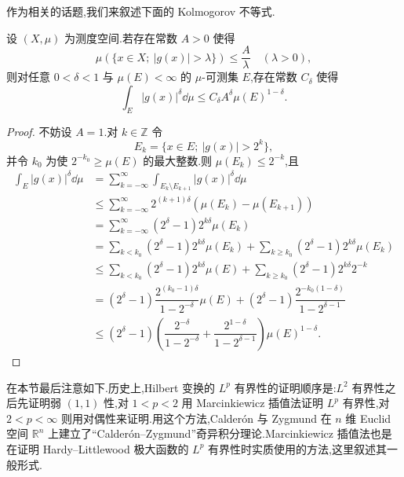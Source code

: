 作为相关的话题,我们来叙述下面的 Kolmogorov 不等式.

\begin{theorem}\label{thm:1.8.5}
设 $(X, \mu)$ 为测度空间.若存在常数 $A > 0$ 使得
\begin{equation*}
\mu(\{x \in X;\ |g(x)| > \lambda\}) \leq \frac{A}{\lambda} \quad (\lambda > 0),
\end{equation*}
则对任意 $0 < \delta < 1$ 与 $\mu(E) < \infty$ 的 $\mu$-可测集 $E$,存在常数 $C_{\delta}$ 使得
\begin{equation*}
\int_{E}|g(x)|^{\delta}\dd \mu \leq C_{\delta}A^{\delta}\mu(E)^{1-\delta}.
\end{equation*}
\end{theorem}

\begin{proof}
不妨设 $A = 1$.对 $k \in \mathbb{Z}$ 令
\begin{equation*}
E_{k} = \{x \in E;\ |g(x)| > 2^{k}\},
\end{equation*}
并令 $k_{0}$ 为使 $2^{-k_{0}} \geq \mu(E)$ 的最大整数.则 $\mu(E_{k}) \leq 2^{-k}$,且
\begin{align*}
\displaystyle\int_{E}|g(x)|^{\delta}\dd \mu &= \sum_{k = -\infty}^{\infty}\int_{E_{k} \setminus E_{k+1}}|g(x)|^{\delta}\dd \mu \\
&\leq \displaystyle\sum_{k = -\infty}^{\infty}2^{(k+1)\delta}\left(\mu(E_{k}) - \mu(E_{k+1})\right) \\
&= \displaystyle\sum_{k = -\infty}^{\infty}(2^{\delta} - 1)2^{k\delta}\mu(E_{k}) \\
&= \displaystyle\sum_{k < k_{0}}(2^{\delta} - 1)2^{k\delta}\mu(E_{k}) + \sum_{k \geq k_{0}}(2^{\delta} - 1)2^{k\delta}\mu(E_{k}) \\
&\leq \displaystyle\sum_{k < k_{0}}(2^{\delta} - 1)2^{k\delta}\mu(E) + \sum_{k \geq k_{0}}(2^{\delta} - 1)2^{k\delta}2^{-k} \\
&= (2^{\delta} - 1)\dfrac{2^{(k_{0}-1)\delta}}{1 - 2^{-\delta}}\mu(E) + (2^{\delta} - 1)\dfrac{2^{-k_{0}(1-\delta)}}{1 - 2^{\delta-1}} \\
&\leq (2^{\delta} - 1)\left(\dfrac{2^{-\delta}}{1 - 2^{-\delta}} + \dfrac{2^{1-\delta}}{1 - 2^{\delta-1}}\right)\mu(E)^{1-\delta}.
\end{align*}
\end{proof}

在本节最后注意如下.历史上,Hilbert 变换的 $L^{p}$ 有界性的证明顺序是:$L^{2}$ 有界性之后先证明弱 $(1,1)$ 性,对 $1 < p < 2$ 用 Marcinkiewicz 插值法证明 $L^{p}$ 有界性,对 $2 < p < \infty$ 则用对偶性来证明.用这个方法,Calderón 与 Zygmund 在 $n$ 维 Euclid 空间 $\mathbb{R}^{n}$ 上建立了``Calderón--Zygmund''奇异积分理论.Marcinkiewicz 插值法也是在证明 Hardy--Littlewood 极大函数的 $L^{p}$ 有界性时实质使用的方法,这里叙述其一般形式.

